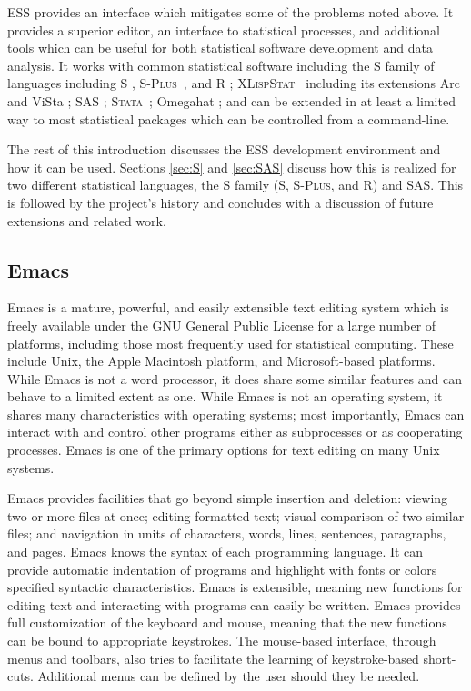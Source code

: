 \documentclass{article}
\newcommand*{\Splus}{\textsc{S-Plus}}
\newcommand*{\XLispStat}{\textsc{XLispStat}}
\newcommand*{\Stata}{\textsc{Stata}}
\begin{document}
ESS provides an interface which mitigates some of the problems noted
above.  It provides a superior editor, an interface to statistical
processes, and additional tools which can be useful for both
statistical software development and data analysis.  It works with
common statistical software including the S family of languages
including S \citep{BecRCW88,ChaJH92,ChaJ98}, \Splus\ \citep{Splus},
and R \citep{ihak:gent:1996}; \XLispStat\ \citep{Tier90} including its
extensions Arc \citep{Cook:Weisberg:1999} and ViSta
\citep{youn:fald:mcfa:1992}; SAS \citep{SAS:8.0}; \Stata\
\citep{Stata:6.0}; Omegahat \citep{DTLang:2000}; and can be extended
in at least a limited way to most statistical packages which can be
controlled from a command-line.

The rest of this introduction discusses the ESS development
environment and how it can be used.  Sections \ref{sec:S} and
\ref{sec:SAS} discuss how this is realized for two different
statistical languages, the S family (S, \Splus, and R)
and SAS.  This is followed by the project's history and concludes
with a discussion of future extensions and related work.

\subsection{Emacs}
\label{sec:intro:emacs}

Emacs \citep{RMS:2000} is a mature, powerful, and easily extensible
text editing system which is freely available under the GNU General
Public License for a large number of platforms, including those most
frequently used for statistical computing.  These include Unix, the
Apple Macintosh platform, and Microsoft-based platforms.  While Emacs
is not a word processor, it does share some similar features and can
behave to a limited extent as one.    While Emacs is
not an operating system, it shares many characteristics with operating
systems; most importantly, Emacs can interact with and control other
programs either as subprocesses or as cooperating processes.
Emacs is one of the primary options for text editing on many Unix
systems.

Emacs provides facilities that go beyond simple insertion and
deletion: viewing two or more files at once; editing formatted text;
visual comparison of two similar files; and navigation in units of characters,
words, lines, sentences, paragraphs, and pages.  Emacs knows
the syntax of each programming language.  It can provide
automatic indentation of programs and highlight with fonts
or colors specified syntactic characteristics.
Emacs is extensible,
meaning new functions for editing text and interacting with programs
can easily be written.  Emacs provides full customization of the
keyboard and mouse, meaning that the new functions can be bound to
appropriate keystrokes.  The mouse-based interface, through menus and
toolbars, also tries to facilitate the learning of keystroke-based
short-cuts.  Additional menus can be defined by the user should they
be needed.
\end{document}
